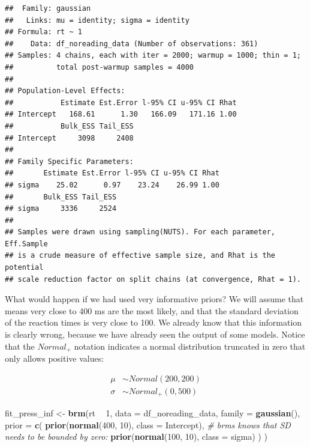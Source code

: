 \documentclass[12pt,]{krantz}
\newenvironment{Shaded}{\begin{snugshade}}{\end{snugshade}}
\newcommand{\CommentTok}[1]{\textcolor[rgb]{0.56,0.35,0.01}{\textit{#1}}}
\newcommand{\DataTypeTok}[1]{\textcolor[rgb]{0.13,0.29,0.53}{#1}}
\newcommand{\DecValTok}[1]{\textcolor[rgb]{0.00,0.00,0.81}{#1}}
\newcommand{\KeywordTok}[1]{\textcolor[rgb]{0.13,0.29,0.53}{\textbf{#1}}}
\newcommand{\NormalTok}[1]{#1}
\newcommand{\OperatorTok}[1]{\textcolor[rgb]{0.81,0.36,0.00}{\textbf{#1}}}
\newcommand{\StringTok}[1]{\textcolor[rgb]{0.31,0.60,0.02}{#1}}
\theoremstyle{definition}
\theoremstyle{definition}
\theoremstyle{definition}
\theoremstyle{remark}
\begin{document}
\begin{verbatim}
##  Family: gaussian 
##   Links: mu = identity; sigma = identity 
## Formula: rt ~ 1 
##    Data: df_noreading_data (Number of observations: 361) 
## Samples: 4 chains, each with iter = 2000; warmup = 1000; thin = 1;
##          total post-warmup samples = 4000
## 
## Population-Level Effects: 
##           Estimate Est.Error l-95% CI u-95% CI Rhat
## Intercept   168.61      1.30   166.09   171.16 1.00
##           Bulk_ESS Tail_ESS
## Intercept     3098     2408
## 
## Family Specific Parameters: 
##       Estimate Est.Error l-95% CI u-95% CI Rhat
## sigma    25.02      0.97    23.24    26.99 1.00
##       Bulk_ESS Tail_ESS
## sigma     3336     2524
## 
## Samples were drawn using sampling(NUTS). For each parameter, Eff.Sample 
## is a crude measure of effective sample size, and Rhat is the potential 
## scale reduction factor on split chains (at convergence, Rhat = 1).
\end{verbatim}

What would happen if we had used very informative priors? We will assume that means very close to 400 ms are the most likely, and that the standard deviation of the reaction times is very close to 100. We already know that this information is clearly wrong, because we have already seen the output of some models. Notice that the \(Normal_+\) notation indicates a normal distribution truncated in zero that only allows positive values:

\begin{equation}
\begin{aligned}
\mu &\sim Normal(200, 200) \\
\sigma &\sim Normal_+(0, 500) 
\end{aligned}
\label{eq:infrtpriors}
\end{equation}

\begin{Shaded}
\begin{Highlighting}[]
\NormalTok{fit_press_inf <-}\StringTok{ }\KeywordTok{brm}\NormalTok{(rt }\OperatorTok{~}\StringTok{ }\DecValTok{1}\NormalTok{,}
  \DataTypeTok{data =}\NormalTok{ df_noreading_data,}
  \DataTypeTok{family =} \KeywordTok{gaussian}\NormalTok{(),}
  \DataTypeTok{prior =} \KeywordTok{c}\NormalTok{(}
    \KeywordTok{prior}\NormalTok{(}\KeywordTok{normal}\NormalTok{(}\DecValTok{400}\NormalTok{, }\DecValTok{10}\NormalTok{), }\DataTypeTok{class =}\NormalTok{ Intercept),}
    \CommentTok{# brms knows that SD needs to be bounded by zero:}
    \KeywordTok{prior}\NormalTok{(}\KeywordTok{normal}\NormalTok{(}\DecValTok{100}\NormalTok{, }\DecValTok{10}\NormalTok{), }\DataTypeTok{class =}\NormalTok{ sigma)}
\NormalTok{  )}
\NormalTok{)}
\end{Highlighting}
\end{Shaded}
\end{document}
